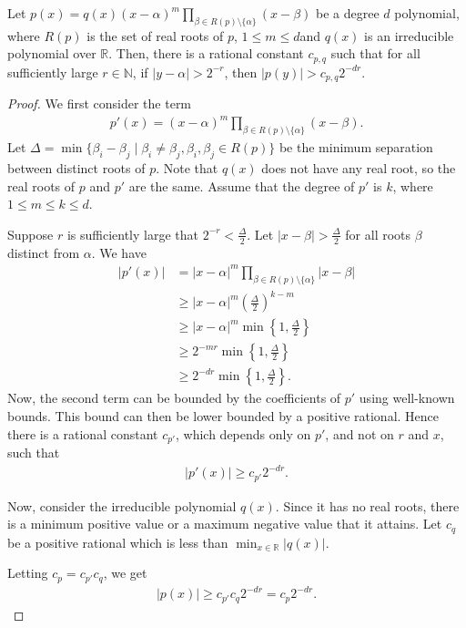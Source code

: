 \documentclass[a4paper,UKenglish,cleveref,autoref,thm-restate]{lipics-v2021}
\newcommand{\R}{\mathbb{R}}
\begin{document}
\begin{lemma}
  \label{lem:poly_bound}
  Let
  $p(x) = q(x) (x-\alpha)^m \prod_{\beta \in R(p)\setminus\{\alpha\}}
  (x-\beta)$ be a degree $d$ polynomial, where $R(p)$ is the set of
  real roots of $p$, $1 \le m \le d$and $q(x)$ is an irreducible
  polynomial over $\R$. Then, there is a rational constant $c_{p,q}$
  such that for all sufficiently large $r \in \mathbb{N}$, if
  $|y-\alpha|>2^{-r}$, then $|p(y)|>c_{p,q} 2^{-dr}$.
\end{lemma}
\begin{proof}
  We first consider the term
  \begin{align*}
    p'(x) = (x-\alpha)^m \prod_{\beta \in R(p)\setminus\{\alpha\}}
    (x-\beta). 
  \end{align*}
  Let
  $\Delta = \min \{\beta_i - \beta_j \mid \beta_i \ne \beta_j,
  \beta_i, \beta_j \in R(p)\}$ be the minimum separation between
  distinct roots of $p$. Note that $q(x)$ does not have any real root,
  so the real roots of $p$ and $p'$ are the same. Assume that the
  degree of $p'$ is $k$, where $1 \le m \le k \le d$.
  

  Suppose $r$ is sufficiently large that $2^{-r}<\frac{\Delta}{2}$.
  Let $|x - \beta| > \frac{\Delta}{2}$ for all roots $\beta$ distinct
  from $\alpha$. We have
  \begin{align*}
    |p'(x)|
    &= |x-\alpha|^m \prod_{\beta \in R(p)\setminus\{\alpha\}} |x -
      \beta|\\
    &\ge |x-\alpha|^m \left(\frac{\Delta}{2}\right)^{k-m}\\
    &\ge |x-\alpha|^m \min\left\{1,\frac{\Delta}{2}\right\}\\
    &\ge 2^{-mr} \min\left\{1,\frac{\Delta}{2}\right\}\\
    &\ge 2^{-dr} \min\left\{1,\frac{\Delta}{2}\right\}.
  \end{align*}
  Now, the second term can be bounded by the coefficients of $p'$
  using well-known bounds. This bound can then be lower bounded by a
  positive rational. Hence there is a rational constant $c_{p'}$,
  which depends only on $p'$, and not on $r$ and $x$, such that
  \begin{align*}
    |p'(x)| \ge  c_{p'} 2^{-dr}.
  \end{align*}

  
  Now, consider the irreducible polynomial $q(x)$. Since it has no
  real roots, there is a minimum positive value or a maximum negative
  value that it attains. Let $c_q$ be a positive rational which is
  less than $\min_{x \in \R} |q(x)|$.

  Letting $c_p=c_{p'}c_q$, we get
  \begin{align*}
    |p(x)| \ge c_{p'} c_{q} 2^{-dr} = c_{p} 2^{-dr}.
  \end{align*}
\end{proof}
\end{document}
